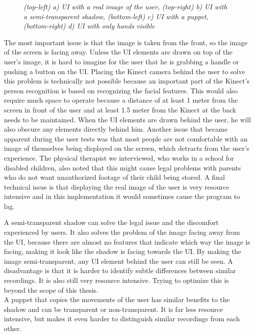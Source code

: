 \begin{figure}[H]
\begin{center}
 		\caption{\emph{(top-left) a) UI with a real image of the user, (top-right) b) UI with a semi-transparent shadow, (bottom-left) c) UI with a puppet, (bottom-right) d) UI with only hands visible}}
 		\label{user visualizations}
 	\end{center}
 \end{figure}
 
 
The most important issue is that the image is taken from the front, so the image of the screen is facing away. Unless the UI elements are drawn on top of the user's image, it is hard to imagine for the user that he is grabbing a handle or pushing a button on the UI. Placing the Kinect camera behind the user to solve this problem is technically not possible because an important part of the Kinect's person recognition is based on recognizing the facial features. This would also require much space to operate because a distance of at least 1 meter from the screen in front of the user and at least 1.5 meter from the Kinect at the back needs to be maintained. When the UI elements are drawn behind the user, he will also obscure any elements directly behind him. Another issue that became apparent during the user tests was that most people are not comfortable with an image of themselves being displayed on the screen, which detracts from the user's experience. The physical therapist we interviewed, who works in a school for disabled children, also noted that this might cause legal problems with parents who do not want unauthorized footage of their child being stored. A final technical issue is that displaying the real image of the user is very resource intensive and in this implementation it would sometimes cause the program to lag.\\

\newpage

A semi-transparent shadow can solve the legal issue and the discomfort experienced by users. It also solves the problem of the image facing away from the UI, because there are almost no features that indicate which way the image is facing, making it look like the shadow is facing towards the UI. By making the image semi-transparent, any UI element behind the user can still be seen. A disadvantage is that it is harder to identify subtle differences between similar recordings. It is also still very resource intensive. Trying to optimize this is beyond the scope of this thesis.\\
 
A puppet that copies the movements of the user has similar benefits to the shadow and can be transparent or non-transparent. It is far less resource intensive, but makes it even harder to distinguish similar recordings from each other.\\
 
